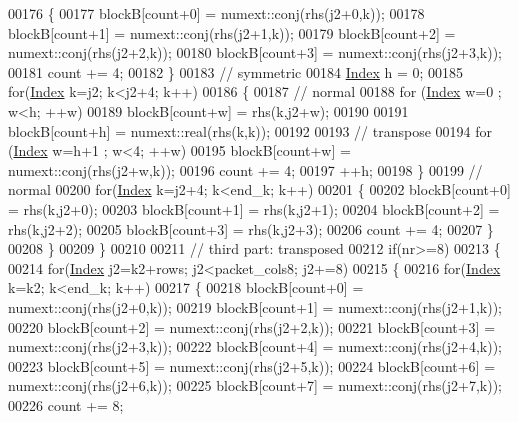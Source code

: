 \begin{DoxyCode}
00176         \{
00177           blockB[count+0] = numext::conj(rhs(j2+0,k));
00178           blockB[count+1] = numext::conj(rhs(j2+1,k));
00179           blockB[count+2] = numext::conj(rhs(j2+2,k));
00180           blockB[count+3] = numext::conj(rhs(j2+3,k));
00181           count += 4;
00182         \}
00183         \textcolor{comment}{// symmetric}
00184         \hyperlink{namespace_eigen_a62e77e0933482dafde8fe197d9a2cfde}{Index} h = 0;
00185         \textcolor{keywordflow}{for}(\hyperlink{namespace_eigen_a62e77e0933482dafde8fe197d9a2cfde}{Index} k=j2; k<j2+4; k++)
00186         \{
00187           \textcolor{comment}{// normal}
00188           \textcolor{keywordflow}{for} (\hyperlink{namespace_eigen_a62e77e0933482dafde8fe197d9a2cfde}{Index} w=0 ; w<h; ++w)
00189             blockB[count+w] = rhs(k,j2+w);
00190 
00191           blockB[count+h] = numext::real(rhs(k,k));
00192 
00193           \textcolor{comment}{// transpose}
00194           \textcolor{keywordflow}{for} (\hyperlink{namespace_eigen_a62e77e0933482dafde8fe197d9a2cfde}{Index} w=h+1 ; w<4; ++w)
00195             blockB[count+w] = numext::conj(rhs(j2+w,k));
00196           count += 4;
00197           ++h;
00198         \}
00199         \textcolor{comment}{// normal}
00200         \textcolor{keywordflow}{for}(\hyperlink{namespace_eigen_a62e77e0933482dafde8fe197d9a2cfde}{Index} k=j2+4; k<end\_k; k++)
00201         \{
00202           blockB[count+0] = rhs(k,j2+0);
00203           blockB[count+1] = rhs(k,j2+1);
00204           blockB[count+2] = rhs(k,j2+2);
00205           blockB[count+3] = rhs(k,j2+3);
00206           count += 4;
00207         \}
00208       \}
00209     \}
00210 
00211     \textcolor{comment}{// third part: transposed}
00212     \textcolor{keywordflow}{if}(nr>=8)
00213     \{
00214       \textcolor{keywordflow}{for}(\hyperlink{namespace_eigen_a62e77e0933482dafde8fe197d9a2cfde}{Index} j2=k2+rows; j2<packet\_cols8; j2+=8)
00215       \{
00216         \textcolor{keywordflow}{for}(\hyperlink{namespace_eigen_a62e77e0933482dafde8fe197d9a2cfde}{Index} k=k2; k<end\_k; k++)
00217         \{
00218           blockB[count+0] = numext::conj(rhs(j2+0,k));
00219           blockB[count+1] = numext::conj(rhs(j2+1,k));
00220           blockB[count+2] = numext::conj(rhs(j2+2,k));
00221           blockB[count+3] = numext::conj(rhs(j2+3,k));
00222           blockB[count+4] = numext::conj(rhs(j2+4,k));
00223           blockB[count+5] = numext::conj(rhs(j2+5,k));
00224           blockB[count+6] = numext::conj(rhs(j2+6,k));
00225           blockB[count+7] = numext::conj(rhs(j2+7,k));
00226           count += 8;

\end{DoxyCode}
